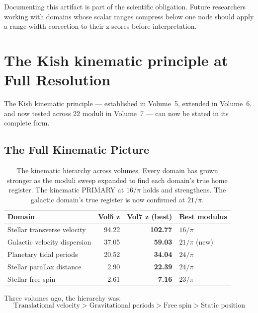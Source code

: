 \documentclass[11pt, letterpaper, openany]{book}
\begin{document}
Documenting this artifact is part of the scientific obligation. Future researchers
working with domains whose scalar ranges compress below one node should apply a
range-width correction to their z-scores before interpretation.

\chapter{The Kish kinematic principle at Full Resolution}

The Kish kinematic principle --- established in Volume~5, extended in Volume~6, and now
tested across 22 moduli in Volume~7 --- can now be stated in its complete form.

\section*{The Full Kinematic Picture}

\begin{table}[H]
\centering
\renewcommand{\arraystretch}{1.3}
\begin{tabular}{|l|r|r|l|}
\hline
\textbf{Domain} & \textbf{Vol5 z} & \textbf{Vol7 z (best)} & \textbf{Best modulus} \\
\hline\hline
Stellar transverse velocity & 94.22 & \textbf{102.77} & $16/\pi$ \\
Galactic velocity dispersion & 37.05 & \textbf{59.03} & $21/\pi$ (new) \\
Planetary tidal periods & 20.52 & \textbf{34.04} & $24/\pi$ \\
Stellar parallax distance & 2.90 & \textbf{22.39} & $24/\pi$ \\
Stellar free spin & 2.61 & \textbf{7.16} & $23/\pi$ \\
\hline
\end{tabular}
\caption{The kinematic hierarchy across volumes. Every domain has grown stronger
as the moduli sweep expanded to find each domain's true home register. The kinematic
PRIMARY at $16/\pi$ holds and strengthens. The galactic domain's true register is
now confirmed at $21/\pi$.}
\label{tab:kinematic_evolution}
\end{table}

Three volumes ago, the hierarchy was:
\[
\text{Translational velocity} > \text{Gravitational periods} > \text{Free spin} > \text{Static position}
\]
\end{document}
